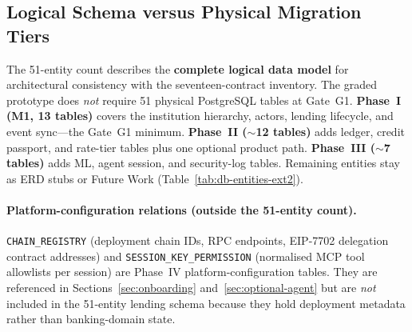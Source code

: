 \documentclass[12pt,a4paper]{report}
\begin{document}
\subsection{Logical Schema versus Physical Migration Tiers}
\label{sec:db-impl-tiers}

The 51-entity count describes the \textbf{complete logical data model} for architectural consistency with the seventeen-contract inventory. The graded prototype does \textit{not} require 51 physical PostgreSQL tables at Gate~G1. \textbf{Phase~I (M1, 13 tables)} covers the institution hierarchy, actors, lending lifecycle, and event sync---the Gate~G1 minimum. \textbf{Phase~II ($\sim$12 tables)} adds ledger, credit passport, and rate-tier tables plus one optional product path. \textbf{Phase~III ($\sim$7 tables)} adds ML, agent session, and security-log tables. Remaining entities stay as ERD stubs or Future Work (Table~\ref{tab:db-entities-ext2}).

\paragraph{Platform-configuration relations (outside the 51-entity count).}
\texttt{CHAIN\_REGISTRY} (deployment chain IDs, RPC endpoints, EIP-7702 delegation contract addresses) and \texttt{SESSION\_KEY\_PERMISSION} (normalised MCP tool allowlists per session) are Phase~IV platform-configuration tables. They are referenced in Sections~\ref{sec:onboarding} and~\ref{sec:optional-agent} but are \textit{not} included in the 51-entity lending schema because they hold deployment metadata rather than banking-domain state.
\end{document}
